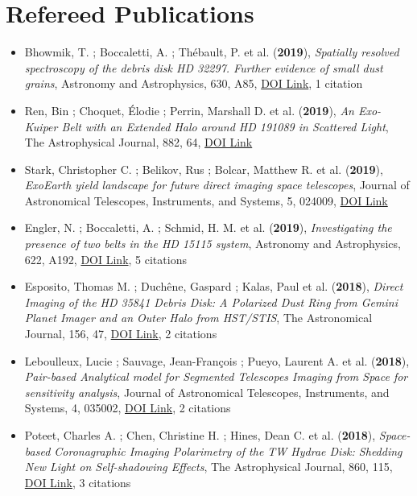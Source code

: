 \documentclass[11pt]{article}
\begin{document}
\section*{Refereed Publications}

\begin{itemize}\itemsep 0pt


\item Bhowmik, T. ; Boccaletti, A. ; Th{\'e}bault, P. et al. ({\bf2019}), {\it Spatially resolved spectroscopy of the debris disk HD 32297. Further evidence of small dust grains}, Astronomy and Astrophysics, 630, A85, \href{https://doi.org/10.1051/0004-6361/201936076}{DOI Link}, 1 citation

\item Ren, Bin ; Choquet, {\'E}lodie ; Perrin, Marshall D. et al. ({\bf2019}), {\it An Exo-Kuiper Belt with an Extended Halo around HD 191089 in Scattered Light}, The Astrophysical Journal, 882, 64, \href{https://doi.org/10.3847/1538-4357/ab3403}{DOI Link}

\item Stark, Christopher C. ; Belikov, Rus ; Bolcar, Matthew R. et al. ({\bf2019}), {\it ExoEarth yield landscape for future direct imaging space telescopes}, Journal of Astronomical Telescopes, Instruments, and Systems, 5, 024009, \href{https://doi.org/10.1117/1.JATIS.5.2.024009}{DOI Link}

\item Engler, N. ; Boccaletti, A. ; Schmid, H. M. et al. ({\bf2019}), {\it Investigating the presence of two belts in the HD 15115 system}, Astronomy and Astrophysics, 622, A192, \href{https://doi.org/10.1051/0004-6361/201833542}{DOI Link}, 5 citations

\item Esposito, Thomas M. ; Duch{\^e}ne, Gaspard ; Kalas, Paul et al. ({\bf2018}), {\it Direct Imaging of the HD 35841 Debris Disk: A Polarized Dust Ring from Gemini Planet Imager and an Outer Halo from HST/STIS}, The Astronomical Journal, 156, 47, \href{https://doi.org/10.3847/1538-3881/aacbc9}{DOI Link}, 2 citations

\item Leboulleux, Lucie ; Sauvage, Jean-Fran{\c{c}}ois ; Pueyo, Laurent A. et al. ({\bf2018}), {\it Pair-based Analytical model for Segmented Telescopes Imaging from Space for sensitivity analysis}, Journal of Astronomical Telescopes, Instruments, and Systems, 4, 035002, \href{https://doi.org/10.1117/1.JATIS.4.3.035002}{DOI Link}, 2 citations

\item Poteet, Charles A. ; Chen, Christine H. ; Hines, Dean C. et al. ({\bf2018}), {\it Space-based Coronagraphic Imaging Polarimetry of the TW Hydrae Disk: Shedding New Light on Self-shadowing Effects}, The Astrophysical Journal, 860, 115, \href{https://doi.org/10.3847/1538-4357/aac2e4}{DOI Link}, 3 citations


\end{itemize}
\end{document}
